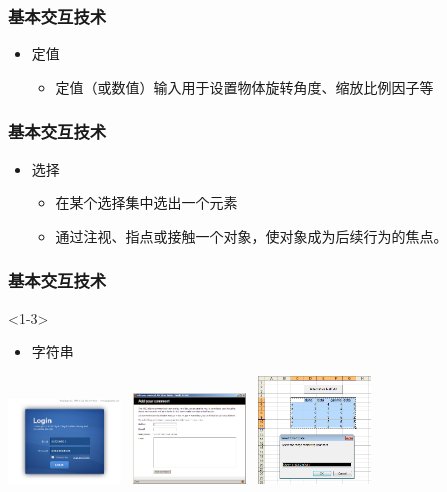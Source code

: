 \documentclass{beamer}
\newcommand{\fullPageImage}[2]{
	{
		\usebackgroundtemplate{\texttt{[image: \#1]}}
		\frame[plain]{#2}
	}
}
\begin{document}
\fullPageImage{images/Blender-tutorial_5.png}{\transwipe}

\begin{frame}
	\frametitle{基本交互技术}
	\beamertemplatetransparentcovereddynamicmedium
	\begin{itemize}[<+->]
		\item 定值
		\begin{itemize}
			\item 定值（或数值）输入用于设置物体旋转角度、缩放比例因子等
		\end{itemize}
	\end{itemize}
\end{frame}

\fullPageImage{images/Blender-tutorial_4.png}{\transwipe}

\begin{frame}
	\frametitle{基本交互技术}
	\beamertemplatetransparentcovereddynamicmedium
	\begin{itemize}[<+->]
		\item 选择
		\begin{itemize}
			\item 在某个选择集中选出一个元素
			\item 通过注视、指点或接触一个对象，使对象成为后续行为的焦点。
		\end{itemize}
	\end{itemize}
\end{frame}

\fullPageImage{images/Blender-tutorial_6.png}{\transwipe}

\begin{frame}
	\frametitle{基本交互技术}
	<1-3> %
	\begin{itemize}
		\item 字符串
	\end{itemize}\pause
	\begin{center}
	\includegraphics[width=3cm]{images/text-input-1.jpg}~\pause
	\includegraphics[width=3cm]{images/text-input-2.jpg}~\pause
	\includegraphics[width=3cm]{images/text-input-3.png}
	\end{center}
\end{frame}
\end{document}
